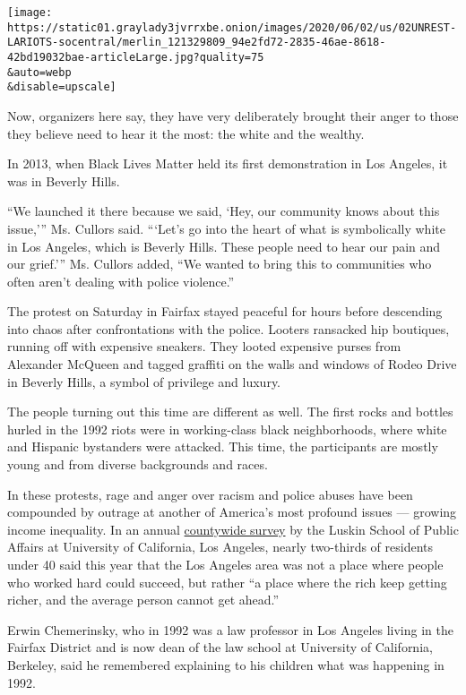 \texttt{[image: https://static01.graylady3jvrrxbe.onion/images/2020/06/02/us/02UNREST-LARIOTS-socentral/merlin\_121329809\_94e2fd72-2835-46ae-8618-42bd19032bae-articleLarge.jpg?quality=75\\\&auto=webp\\\&disable=upscale]}

Now, organizers here say, they have very deliberately brought their
anger to those they believe need to hear it the most: the white and the
wealthy.

In 2013, when Black Lives Matter held its first demonstration in Los
Angeles, it was in Beverly Hills.

``We launched it there because we said, `Hey, our community knows about
this issue,''' Ms. Cullors said. ```Let's go into the heart of what is
symbolically white in Los Angeles, which is Beverly Hills. These people
need to hear our pain and our grief.''' Ms. Cullors added, ``We wanted
to bring this to communities who often aren't dealing with police
violence.''

The protest on Saturday in Fairfax stayed peaceful for hours before
descending into chaos after confrontations with the police. Looters
ransacked hip boutiques, running off with expensive sneakers. They
looted expensive purses from Alexander McQueen and tagged graffiti on
the walls and windows of Rodeo Drive in Beverly Hills, a symbol of
privilege and luxury.

The people turning out this time are different as well. The first rocks
and bottles hurled in the 1992 riots were in working-class black
neighborhoods, where white and Hispanic bystanders were attacked. This
time, the participants are mostly young and from diverse backgrounds and
races.

In these protests, rage and anger over racism and police abuses have
been compounded by outrage at another of America's most profound issues
--- growing income inequality. In an annual
\href{https://ucla.app.box.com/s/zy3dxv91oywq70iht1giyvlhknafjs8d}{countywide
survey} by the Luskin School of Public Affairs at University of
California, Los Angeles, nearly two-thirds of residents under 40 said
this year that the Los Angeles area was not a place where people who
worked hard could succeed, but rather ``a place where the rich keep
getting richer, and the average person cannot get ahead.''

Erwin Chemerinsky, who in 1992 was a law professor in Los Angeles living
in the Fairfax District and is now dean of the law school at University
of California, Berkeley, said he remembered explaining to his children
what was happening in 1992.

